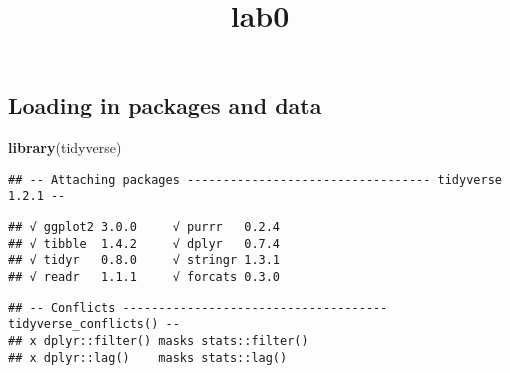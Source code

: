 \documentclass[]{article}
\title{lab0}
\author{}
\date{}
\newenvironment{Shaded}{\begin{snugshade}}{\end{snugshade}}
\newcommand{\KeywordTok}[1]{\textcolor[rgb]{0.13,0.29,0.53}{\textbf{{#1}}}}
\newcommand{\NormalTok}[1]{{#1}}
\begin{document}
\maketitle

\subsection{Loading in packages and
data}\label{loading-in-packages-and-data}

\begin{Shaded}
\begin{Highlighting}[]
\KeywordTok{library}\NormalTok{(tidyverse)}
\end{Highlighting}
\end{Shaded}

\begin{verbatim}
## -- Attaching packages ---------------------------------- tidyverse 1.2.1 --
\end{verbatim}

\begin{verbatim}
## √ ggplot2 3.0.0     √ purrr   0.2.4
## √ tibble  1.4.2     √ dplyr   0.7.4
## √ tidyr   0.8.0     √ stringr 1.3.1
## √ readr   1.1.1     √ forcats 0.3.0
\end{verbatim}

\begin{verbatim}
## -- Conflicts ------------------------------------- tidyverse_conflicts() --
## x dplyr::filter() masks stats::filter()
## x dplyr::lag()    masks stats::lag()
\end{verbatim}
\end{document}
